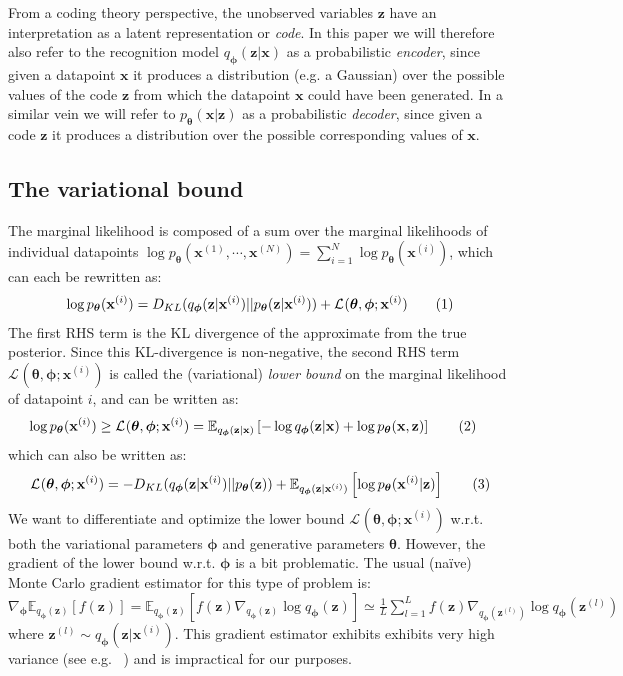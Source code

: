 \documentclass{article} %
\theoremstyle{definition}
\newcommand{\bb}[1]{\mathbf{#1}}
\newcommand{\bx}{\bb{x}}
\newcommand{\bxi}{\bx^{(i)}}
\newcommand{\bz}{\bb{z}}
\newcommand{\bzl}{\bz^{(l)}}
\newcommand{\bT}{\boldsymbol{\theta}}
\newcommand{\bphi}{\boldsymbol{\phi}}
\newcommand{\pT}{p_{\bT}}
\newcommand{\qPhi}{q_{\bphi}}
\newcommand{\Exp}[2]{\mathbb{E}_{#1}\left[#2\right]}
\newcommand{\eqnr}{\addtocounter{equation}{1}\tag{\theequation}}
\theoremstyle{definition}
\newcommand{\LB}[2]{\mathcal{L}^{#1}(\bT,\bphi; #2)}
\begin{document}
%

%
From a coding theory perspective, the unobserved variables $\bz$ have an interpretation as a latent representation or \emph{code}.  In this paper we will therefore also refer to the recognition model $\qPhi(\bz|\bx)$ as a probabilistic \emph{encoder}, since given a datapoint $\bx$ it produces a distribution (e.g. a Gaussian) over the possible values of the code $\bz$ from which the datapoint $\bx$ could have been generated. In a similar vein we will refer to $\pT(\bx|\bz)$ as a probabilistic \emph{decoder}, since given a code $\bz$ it produces a distribution over the possible corresponding values of $\bx$. 
%

\subsection{The variational bound}
The marginal likelihood is composed of a sum over the marginal likelihoods of individual datapoints $\log \pT(\bx^{(1)}, \cdots, \bx^{(N)}) = \sum_{i=1}^N \log \pT(\bxi)$, which can each be rewritten as:
\begin{align*}
\log \pT(\bxi) = D_{KL}(\qPhi(\bz|\bxi)||\pT(\bz|\bxi)) + \LB{}{\bxi}
\eqnr\end{align*}
The first RHS term is the KL divergence of the approximate from the true posterior. Since this KL-divergence is non-negative, the second RHS term $\LB{}{\bxi}$ is called the (variational) \emph{lower bound} on the marginal likelihood of datapoint $i$, and can be written as:
\begin{align*}
\log \pT(\bxi) \geq \LB{}{\bxi}
&= \Exp{\qPhi(\bz|\bx)}{- \log \qPhi(\bz|\bx) + \log \pT(\bx,\bz)}
\eqnr\label{eq:lowerbound}\end{align*}
which can also be written as:
\begin{align*}
\LB{}{\bxi} = - D_{KL}(\qPhi(\bz|\bxi) || \pT(\bz)) + \Exp{\qPhi(\bz|\bxi)}{\log \pT(\bxi | \bz)}
\eqnr\label{eq:lowerbound2}\end{align*}
We want to differentiate and optimize the lower bound $\LB{}{\bxi}$ w.r.t. both the variational parameters $\bphi$ and generative parameters $\bT$. However, the gradient of the lower bound w.r.t. $\bphi$ is a bit problematic. The usual (na\"ive) Monte Carlo gradient estimator for this type of problem is:
$\nabla_{\bphi} \Exp{\qPhi(\bz)}{f(\bz)} = \Exp{\qPhi(\bz)}{f(\bz) \nabla_{\qPhi(\bz)} \log \qPhi(\bz) } \simeq \frac{1}{L} \sum_{l=1}^L f(\bz) \nabla_{\qPhi(\bzl)} \log \qPhi(\bzl)$ where $\bzl \sim \qPhi(\bz|\bxi)$. This gradient estimator exhibits exhibits very high variance (see e.g. ~\cite{blei2012variational}) and is impractical for our purposes.
\end{document}
